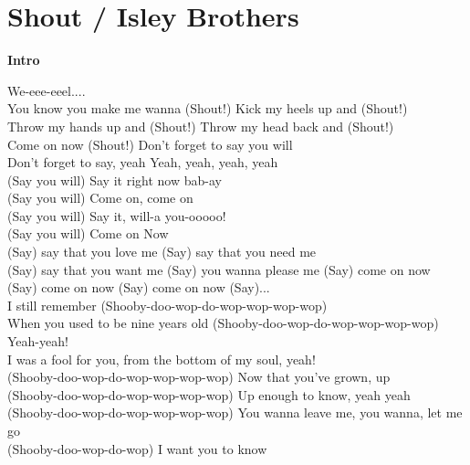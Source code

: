 \section{Shout / Isley Brothers}\label{sec:shout}

\Fmajor
\Dminor
\BflatSeven


\textbf{Intro}

We-eee-eeel....      \\                       
You know you make me wanna (Shout!) Kick my heels up and (Shout!)\\
Throw my hands up and (Shout!) Throw my head back and (Shout!)\\
Come on now (Shout!) Don't forget to say you will\\
Don't forget to say, yeah Yeah, yeah, yeah, yeah\\
(Say you will) Say it right now bab-ay\\
(Say you will) Come on, come on\\
(Say you will) Say it, will-a you-ooooo!\\
(Say you will) Come on Now\\
(Say) say that you love me (Say) say that you need me\\
(Say) say that you want me
(Say) you wanna please me (Say) come on now \\
(Say) come on now  (Say) come on now  (Say)...\\
I still remember (Shooby-doo-wop-do-wop-wop-wop-wop)\\
When you used to be nine years old (Shooby-doo-wop-do-wop-wop-wop-wop) Yeah-yeah!\\
I was a fool for you, from the bottom of my soul, yeah!\\
(Shooby-doo-wop-do-wop-wop-wop-wop) Now that you've grown, up\\
(Shooby-doo-wop-do-wop-wop-wop-wop) Up enough to know, yeah yeah\\
(Shooby-doo-wop-do-wop-wop-wop-wop) You wanna leave me, you wanna, let me go\\
(Shooby-doo-wop-do-wop) I want you to know    \\
